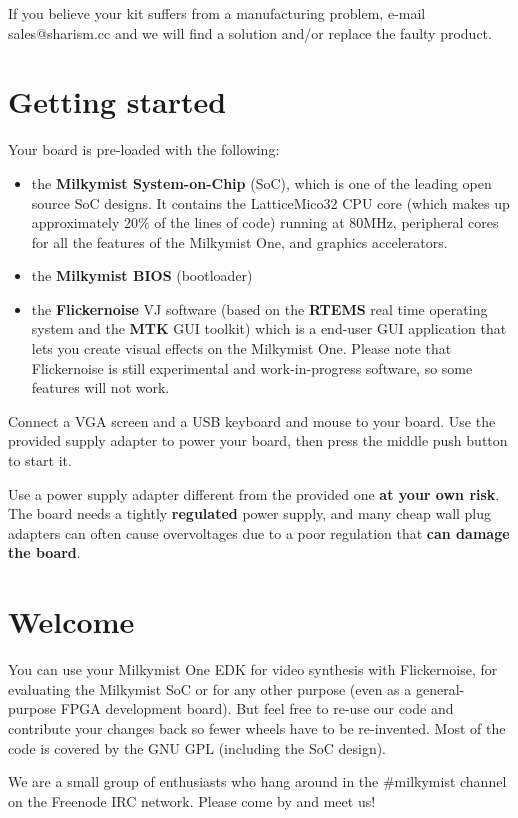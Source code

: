 \documentclass{leaflet}
\begin{document}
If you believe your kit suffers from a manufacturing problem, e-mail sales@sharism.cc and we will find a solution and/or replace the faulty product.

\section{Getting started}
Your board is pre-loaded with the following:
\begin{itemize}
\item the \textbf{Milkymist System-on-Chip} (SoC), which is one of the leading open source SoC designs. It contains the LatticeMico32 CPU core (which makes up approximately 20\% of the lines of code) running at 80MHz, peripheral cores for all the features of the Milkymist One, and graphics accelerators.
\item the \textbf{Milkymist BIOS} (bootloader)
\item the \textbf{Flickernoise} VJ software (based on the \textbf{RTEMS} real time operating system and the \textbf{MTK} GUI toolkit) which is a end-user GUI application that lets you create visual effects on the Milkymist One. Please note that Flickernoise is still experimental and work-in-progress software, so some features will not work.
\end{itemize}

Connect a VGA screen and a USB keyboard and mouse to your board. Use the provided supply adapter to power your board, then press the middle push button to start it.

Use a power supply adapter different from the provided one \textbf{at your own risk}. The board needs a tightly \textbf{regulated} power supply, and many cheap wall plug adapters can often cause overvoltages due to a poor regulation that \textbf{can damage the board}.

\section{Welcome}
You can use your Milkymist One EDK for video synthesis with Flickernoise, for evaluating the Milkymist SoC or for any other purpose (even as a general-purpose FPGA development board). But feel free to re-use our code and contribute your changes back so fewer wheels have to be re-invented. Most of the code is covered by the GNU GPL (including the SoC design).

We are a small group of enthusiasts who hang around in the \#milkymist channel on the Freenode IRC network. Please come by and meet us!
\end{document}
